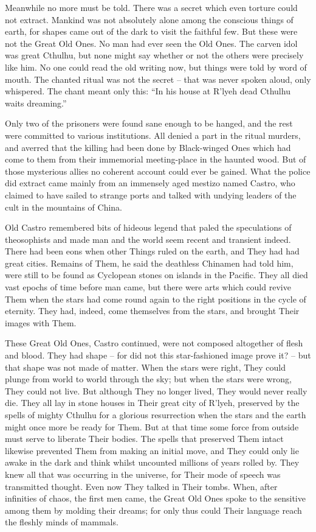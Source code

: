 Meanwhile no more must be told. There was a secret which even torture could not extract. Mankind was not absolutely alone among the conscious things of earth, for shapes came out of the dark to visit the faithful few. But these were not the Great Old Ones. No man had ever seen the Old Ones. The carven idol was great Cthulhu, but none might say whether or not the others were precisely like him. No one could read the old writing now, but things were told by word of mouth. The chanted ritual was not the secret⁠ – that was never spoken aloud, only whispered. The chant meant only this: “In his house at R’lyeh dead Cthulhu waits dreaming.”

\sectionbreak

Only two of the prisoners were found sane enough to be hanged, and the rest were committed to various institutions. All denied a part in the ritual murders, and averred that the killing had been done by Black-winged Ones which had come to them from their immemorial meeting-place in the haunted wood. But of those mysterious allies no coherent account could ever be gained. What the police did extract came mainly from an immensely aged mestizo named Castro, who claimed to have sailed to strange ports and talked with undying leaders of the cult in the mountains of China.

Old Castro remembered bits of hideous legend that paled the speculations of theosophists and made man and the world seem recent and transient indeed. There had been eons when other Things ruled on the earth, and They had had great cities. Remains of Them, he said the deathless Chinamen had told him, were still to be found as Cyclopean stones on islands in the Pacific. They all died vast epochs of time before man came, but there were arts which could revive Them when the stars had come round again to the right positions in the cycle of eternity. They had, indeed, come themselves from the stars, and brought Their images with Them.

These Great Old Ones, Castro continued, were not composed altogether of flesh and blood. They had shape⁠ – for did not this star-fashioned image prove it?⁠ – but that shape was not made of matter. When the stars were right, They could plunge from world to world through the sky; but when the stars were wrong, They could not live. But although They no longer lived, They would never really die. They all lay in stone houses in Their great city of R’lyeh, preserved by the spells of mighty Cthulhu for a glorious resurrection when the stars and the earth might once more be ready for Them. But at that time some force from outside must serve to liberate Their bodies. The spells that preserved Them intact likewise prevented Them from making an initial move, and They could only lie awake in the dark and think whilst uncounted millions of years rolled by. They knew all that was occurring in the universe, for Their mode of speech was transmitted thought. Even now They talked in Their tombs. When, after infinities of chaos, the first men came, the Great Old Ones spoke to the sensitive among them by molding their dreams; for only thus could Their language reach the fleshly minds of mammals.

